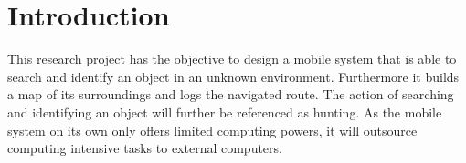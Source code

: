 \cleardoublepage
\pagestyle{fancy} %
\fancyhead{}
\fancyhf{}
\renewcommand{\headrulewidth}{0pt}
\renewcommand{\footrulewidth}{0.4pt}

\section{Introduction}

This research project has the objective to design a mobile system that is able to search and identify an object in an unknown environment. Furthermore it builds a map of its surroundings and logs the navigated route. The action of searching and identifying an object will further be referenced as hunting. As the mobile system on its own only offers limited computing powers, it will outsource computing intensive tasks to external computers. 
